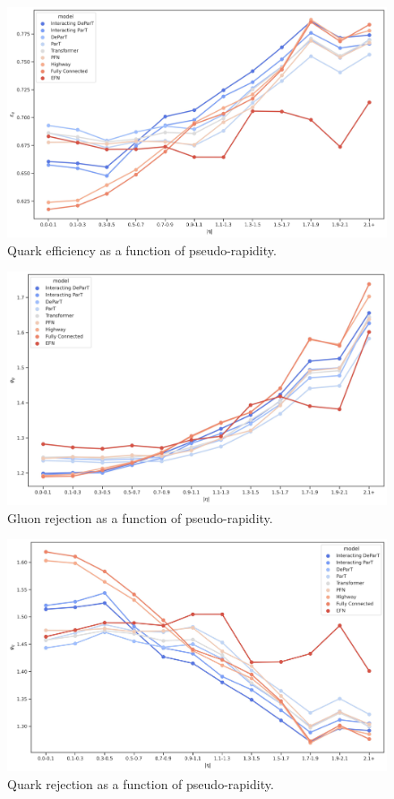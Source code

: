 \begin{figure}[htb]
    \centering
    \includegraphics[width=0.95\linewidth]{src/plots/results/eta_dep/quark_efficiency.jpg}
    \caption{Quark efficiency as a function of pseudo-rapidity.}
    \label{fig:quark_eff_eta}
\end{figure}

\begin{figure}[htb]
    \centering
    \includegraphics[width=0.95\linewidth]{src/plots/results/eta_dep/gluon_rejection.jpg}
    \caption{Gluon rejection as a function of pseudo-rapidity.}
    \label{fig:gluon_rej_eta}
\end{figure}

\begin{figure}[htb]
    \centering
    \includegraphics[width=0.95\linewidth]{src/plots/results/eta_dep/quark_rejection.jpg}
    \caption{Quark rejection as a function of pseudo-rapidity.}
    \label{fig:quark_rej_eta}
\end{figure}

